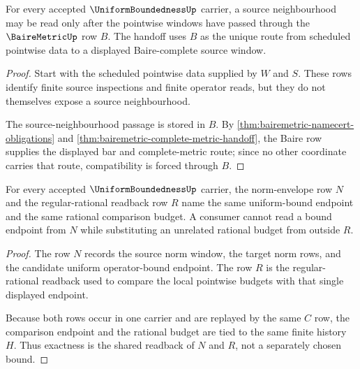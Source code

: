 \begin{theorem}
\label{thm:uniform-boundedness-baire-handoff-compatibility}
For every accepted $\UniformBoundednessUp$ carrier, a source neighbourhood may be read only after the pointwise windows have passed through the $\BaireMetricUp$ row $B$. The handoff uses $B$ as the unique route from scheduled pointwise data to a displayed Baire-complete source window.
\end{theorem}
\begin{proof}
Start with the scheduled pointwise data supplied by $W$ and $S$. These rows identify finite source inspections and finite operator reads, but they do not themselves expose a source neighbourhood.

The source-neighbourhood passage is stored in $B$. By \autoref{thm:bairemetric-namecert-obligations} and \autoref{thm:bairemetric-complete-metric-handoff}, the Baire row supplies the displayed bar and complete-metric route; since no other coordinate carries that route, compatibility is forced through $B$.
\end{proof}

\begin{theorem}
\label{thm:uniform-boundedness-norm-envelope-exactness}
For every accepted $\UniformBoundednessUp$ carrier, the norm-envelope row $N$ and the regular-rational readback row $R$ name the same uniform-bound endpoint and the same rational comparison budget. A consumer cannot read a bound endpoint from $N$ while substituting an unrelated rational budget from outside $R$.
\end{theorem}
\begin{proof}
The row $N$ records the source norm window, the target norm rows, and the candidate uniform operator-bound endpoint. The row $R$ is the regular-rational readback used to compare the local pointwise budgets with that single displayed endpoint.

Because both rows occur in one carrier and are replayed by the same $C$ row, the comparison endpoint and the rational budget are tied to the same finite history $H$. Thus exactness is the shared readback of $N$ and $R$, not a separately chosen bound.
\end{proof}

